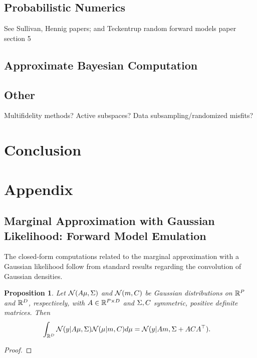 \documentclass[12pt]{article}
\newtheorem{prop}{Proposition}
\begin{document}
\subsection{Probabilistic Numerics} \label{sec:prob-numerics}
See Sullivan, Hennig papers; and Teckentrup random forward models paper section 5

\subsection{Approximate Bayesian Computation} \label{sec:abc}

\subsection{Other}
Multifidelity methods? Active subspaces? Data subsampling/randomized misfits?

\section{Conclusion} \label{sec:conclusion}


\section{Appendix}

\subsection{Marginal Approximation with Gaussian Likelihood: Forward Model Emulation}
The closed-form computations related to the marginal approximation with a Gaussian 
likelihood follow from standard results regarding the convolution of Gaussian densities.  

\begin{prop} \label{Gaussian_convolution}
Let $\mathcal{N}(A \mu, \Sigma)$ and $\mathcal{N}(m, C)$ be Gaussian distributions on $\mathbb{R}^{P}$ and $\mathbb{R}^{D}$, 
respectively, with $A \in \mathbb{R}^{P \times D}$ and $\Sigma, C$ symmetric, positive definite matrices. Then 
\begin{align*}
\int_{\mathbb{R}^{D}} \mathcal{N}(y | A \mu, \Sigma) \mathcal{N}(\mu | m, C) d\mu
&= \mathcal{N}(y | Am, \Sigma + ACA^\top). 
\end{align*}
\end{prop}

\begin{proof} 
\todo
\end{proof}
\end{document}
